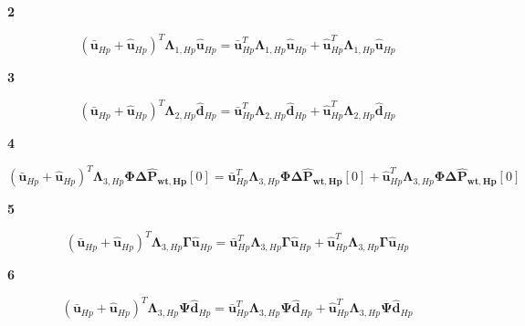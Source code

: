 \textbf{2}

\begin{equation}
 ({\bm{\bar{u}}}_{Hp} + {\bm{\hat{u}}}_{Hp})^{T} {\bm{\Lambda}}_{1,Hp}{\bm{\hat{u}}_{Hp}}  = {\bm{\bar{u}}}_{Hp}^{T} {\bm{\Lambda}}_{1,Hp} {\bm{\hat{u}}_{Hp}} + {\bm{\hat{u}}}_{Hp}^{T} {\bm{\Lambda}}_{1,Hp} {\bm{\hat{u}}_{Hp}} 
\end{equation}

\textbf{3}

\begin{equation}
 ({\bm{\bar{u}}}_{Hp} + {\bm{\hat{u}}}_{Hp})^{T} {\bm{\Lambda}}_{2,Hp} {\bm{\hat{d}}}_{Hp}  = {\bm{\bar{u}}}_{Hp}^{T} {\bm{\Lambda}}_{2,Hp} {\bm{\hat{d}}_{Hp}} 
 + {\bm{\hat{u}}}_{Hp}^{T} {\bm{\Lambda}}_{2,Hp} {\bm{\hat{d}}_{Hp}}  
\end{equation}

\textbf{4}

\begin{equation}
 ({\bm{\bar{u}}}_{Hp} + {\bm{\hat{u}}}_{Hp})^{T} {\bm{\Lambda}}_{3,Hp} \bm{\Phi} \bm{\Delta \hat{P}_{wt,Hp}}[0]   =  {\bm{\bar{u}}}_{Hp}^{T} {\bm{\Lambda}}_{3,Hp} \bm{\Phi} \bm{\Delta \hat{P}_{wt,Hp}}[0] + 
 {\bm{\hat{u}}}_{Hp}^{T} {\bm{\Lambda}}_{3,Hp} \bm{\Phi} \bm{\Delta \hat{P}_{wt,Hp}}[0]  
\end{equation}

\textbf{5}

\begin{equation}
 ({\bm{\bar{u}}}_{Hp} + {\bm{\hat{u}}}_{Hp})^{T} {\bm{\Lambda}}_{3,Hp} \bm{\Gamma} \bm{\hat{u}}_{Hp}   =  {\bm{\bar{u}}}_{Hp}^{T} {\bm{\Lambda}}_{3,Hp} {\bm{\Gamma}} \bm{\hat{u}}_{Hp} + 
 {\bm{\hat{u}}}_{Hp}^{T} {\bm{\Lambda}}_{3,Hp} \bm{\Gamma} \bm{\hat{u}}_{Hp} 
\end{equation}

\textbf{6}

\begin{equation}
 ({\bm{\bar{u}}}_{Hp} + {\bm{\hat{u}}}_{Hp})^{T} {\bm{\Lambda}}_{3,Hp} \bm{\Psi} \bm{\hat{d}}_{Hp}   =  {\bm{\bar{u}}}_{Hp}^{T} {\bm{\Lambda}}_{3,Hp} {\bm{\Psi}} \bm{\hat{d}}_{Hp} + 
 {\bm{\hat{u}}}_{Hp}^{T} {\bm{\Lambda}}_{3,Hp} \bm{\Psi} \bm{\hat{d}}_{Hp} 
 \label{obj_12}
\end{equation}

